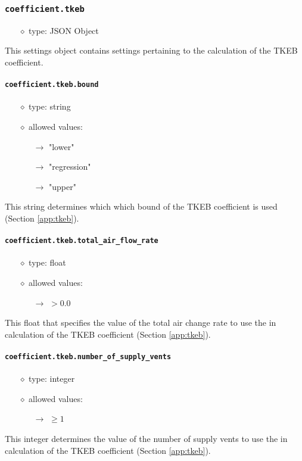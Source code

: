\documentclass[]{article}
\def\code#1{\texttt{#1}}
\begin{document}
\subsubsection{\code{coefficient.tkeb}}\label{sec:coefftkeb}
\begin{itemize}
    \item[$\diamond$] type: JSON Object 
\end{itemize}
This settings object contains settings pertaining to the calculation of the TKEB
coefficient.

\paragraph{\code{coefficient.tkeb.bound}}
\begin{itemize}
    \item[$\diamond$] type: string 
    \item[$\diamond$] allowed values:
    \begin{itemize}
        \item[$\rightarrow$] "lower"
        \item[$\rightarrow$] "regression"
        \item[$\rightarrow$] "upper"
    \end{itemize}
\end{itemize}
This string determines which which bound of the TKEB coefficient is used
(Section \ref{app:tkeb}).

\paragraph{\code{coefficient.tkeb.total\_air\_flow\_rate}}
\begin{itemize}
    \item[$\diamond$] type: float
    \item[$\diamond$] allowed values:
    \begin{itemize}
        \item[$\rightarrow$] $>0.0$
    \end{itemize}
\end{itemize}
This float that specifies the value of the total air change rate to use the in
calculation of the TKEB coefficient (Section \ref{app:tkeb}).

\paragraph{\code{coefficient.tkeb.number\_of\_supply\_vents}}
\begin{itemize}
    \item[$\diamond$] type: integer 
    \item[$\diamond$] allowed values:
    \begin{itemize}
        \item[$\rightarrow$] $\geq 1$
    \end{itemize}
\end{itemize}
This integer determines the value of the number of supply vents to use the in
calculation of the TKEB coefficient (Section \ref{app:tkeb}).
\end{document}
